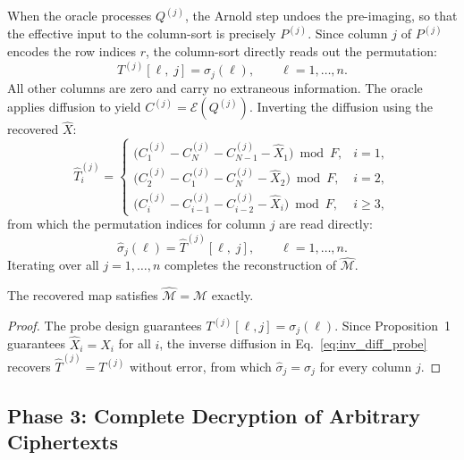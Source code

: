 When the oracle processes $Q^{(j)}$, the Arnold step undoes the pre-imaging, so that the effective input to the column-sort is precisely $P^{(j)}$. Since column $j$ of $P^{(j)}$ encodes the row indices $r$, the column-sort directly reads out the permutation:
\begin{equation}
    T^{(j)}[\ell,\; j] = \sigma_j(\ell), \qquad \ell = 1, \ldots, n.
\end{equation}
All other columns are zero and carry no extraneous information. The oracle applies diffusion to yield $C^{(j)} = \mathcal{E}(Q^{(j)})$. Inverting the diffusion using the recovered $\hat{X}$:
\begin{equation}
\hat{T}^{(j)}_i =
\begin{cases}
\bigl(C^{(j)}_1 - C^{(j)}_{N} - C^{(j)}_{N-1} - \hat{X}_1\bigr) \bmod F, & i = 1,\\[4pt]
\bigl(C^{(j)}_2 - C^{(j)}_1 - C^{(j)}_{N} - \hat{X}_2\bigr) \bmod F, & i = 2,\\[4pt]
\bigl(C^{(j)}_i - C^{(j)}_{i-1} - C^{(j)}_{i-2} - \hat{X}_i\bigr) \bmod F, & i \geq 3,
\end{cases}
\label{eq:inv_diff_probe}
\end{equation}
from which the permutation indices for column $j$ are read directly:
\begin{equation}
    \hat{\sigma}_j(\ell) = \hat{T}^{(j)}[\ell,\; j], \qquad \ell = 1, \ldots, n.
\end{equation}
Iterating over all $j = 1, \ldots, n$ completes the reconstruction of $\hat{\mathcal{M}}$.

\begin{proposition}
The recovered map satisfies $\hat{\mathcal{M}} = \mathcal{M}$ exactly.
\end{proposition}

\begin{proof}
The probe design guarantees $T^{(j)}[\ell,j] = \sigma_j(\ell)$. Since Proposition~1 guarantees $\hat{X}_i = X_i$ for all $i$, the inverse diffusion in Eq.~\eqref{eq:inv_diff_probe} recovers $\hat{T}^{(j)} = T^{(j)}$ without error, from which $\hat{\sigma}_j = \sigma_j$ for every column $j$.
\end{proof}

\subsection{Phase 3: Complete Decryption of Arbitrary Ciphertexts}

